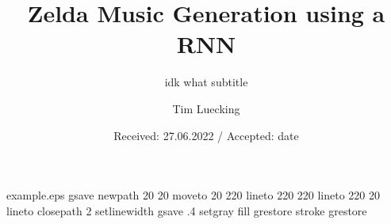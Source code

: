 %
%
%
%
%
\begin{filecontents*}{example.eps}
gsave
newpath
  20 20 moveto
  20 220 lineto
  220 220 lineto
  220 20 lineto
closepath
2 setlinewidth
gsave
  .4 setgray fill
grestore
stroke
grestore
\end{filecontents*}
%
\documentclass[twocolumn,fleqn,runningheads]{svjour2}
%
\smartqed  %
%
\usepackage{graphicx}
\usepackage{biograph} 
\usepackage{mwe}
\usepackage{subfig}       %
%
%
%
%
%


\title{Zelda Music Generation using a RNN%
}
\subtitle{idk what subtitle}


\author{Tim Luecking}



\date{Received: 27.06.2022 / Accepted: date}


